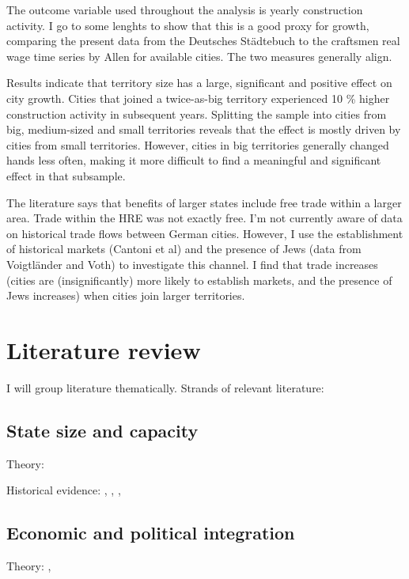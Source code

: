 \documentclass{article}
\begin{document}
The outcome variable used throughout the analysis is yearly construction activity. I go to some lenghts to show that this is a good proxy for growth, comparing the present data from the Deutsches St\"adtebuch to the craftsmen real wage time series by Allen for available cities. The two measures generally align.

Results indicate that territory size has a large, significant and positive effect on city growth. Cities that joined a twice-as-big territory experienced 10 \% higher construction activity in subsequent years. Splitting the sample into cities from big, medium-sized and small territories reveals that the effect is mostly driven by cities from small territories. However, cities in big territories generally changed hands less often, making it more difficult to find a meaningful and significant effect in that subsample.

The literature says that benefits of larger states include free trade within a larger area. Trade within the HRE was not exactly free. I'm not currently aware of data on historical trade flows between German cities. However, I use the establishment of historical markets (Cantoni et al) and the presence of Jews (data from Voigtl\"ander and Voth) to investigate this channel. I find that trade increases (cities are (insignificantly) more likely to establish markets, and the presence of Jews increases) when cities join larger territories.

\section{Literature review}

I will group literature thematically. Strands of relevant literature: 

\subsection{State size and capacity}

Theory: \cite{as1997}

Historical evidence: \cite{cervellati2022}, \cite{koyama2017}, \cite{schoenholzer2018}, \cite{sng2014}

\subsection{Economic and political integration}

Theory: \cite{sapir2011}, \cite{asw2000}
\end{document}
